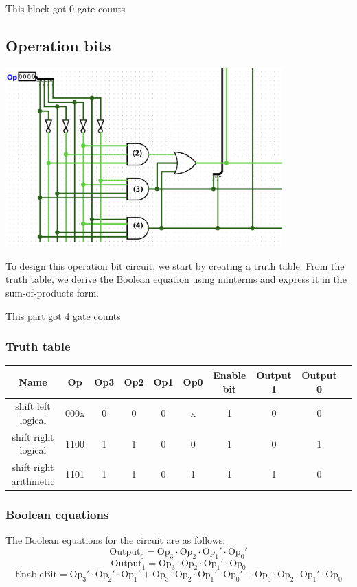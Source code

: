 \documentclass{article}
\begin{document}
\hspace{2em}This block got 0 gate counts
\subsection{Operation bits}
\begin{center}
    \includegraphics[width=0.8\textwidth]{images/ShifterSelectionBits.png}
\end{center}
\hspace{2em}To design this operation bit circuit, we start by creating a truth table. From the truth table, we derive the Boolean equation using minterms and express it in the sum-of-products form.

\hspace{2em} This part got 4 gate counts
\subsubsection{Truth table}
\begin{table}[H]
\centering
\begin{tabular}{|c|c|c|c|c|c|c|c|c|c|}
\hline
Name & Op & Op3 & Op2 & Op1 & Op0 & Enable bit & Output 1 & Output 0 \\ \hline
shift left logical & 000x & 0 & 0 & 0 & x & 1 & 0 & 0 \\ \hline
shift right logical & 1100 & 1 & 1 & 0 & 0 & 1 & 0 & 1 \\ \hline
shift right arithmetic & 1101 & 1 & 1 & 0 & 1 & 1 & 1 & 0 \\ \hline
\end{tabular}
\end{table}

\subsubsection{Boolean equations}
The Boolean equations for the circuit are as follows:
\[
\text{Output}_0 = \text{Op}_3 \cdot \text{Op}_2 \cdot \text{Op}_1' \cdot \text{Op}_0'
\]
\[
\text{Output}_1 = \text{Op}_3 \cdot \text{Op}_2 \cdot \text{Op}_1' \cdot \text{Op}_0
\]
\[
\text{EnableBit} = \text{Op}_3' \cdot \text{Op}_2' \cdot \text{Op}_1' + \text{Op}_3 \cdot \text{Op}_2 \cdot \text{Op}_1' \cdot \text{Op}_0' + \text{Op}_3 \cdot \text{Op}_2 \cdot \text{Op}_1' \cdot \text{Op}_0
\]
\end{document}
